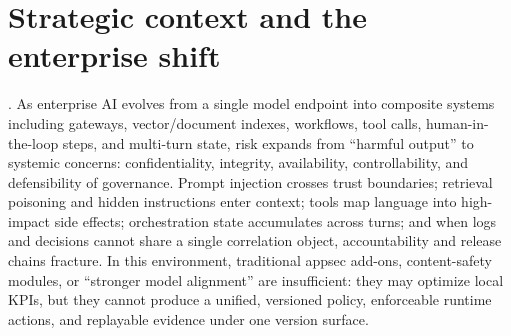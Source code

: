 \documentclass[11pt,a4paper]{report}
\begin{document}

\section{Strategic context and the enterprise shift}
\ControlPlane{}. As enterprise AI evolves from a single model endpoint into composite systems including gateways, vector/document indexes, workflows, tool calls, human-in-the-loop steps, and multi-turn state, risk expands from “harmful output” to systemic concerns: confidentiality, integrity, availability, controllability, and defensibility of governance. Prompt injection crosses trust boundaries; retrieval poisoning and hidden instructions enter context; tools map language into high-impact side effects; orchestration state accumulates across turns; and when logs and decisions cannot share a single correlation object, accountability and release chains fracture. In this environment, traditional appsec add-ons, content-safety modules, or “stronger model alignment” are insufficient: they may optimize local KPIs, but they cannot produce a unified, versioned policy, enforceable runtime actions, and replayable evidence under one version surface.
\end{document}

